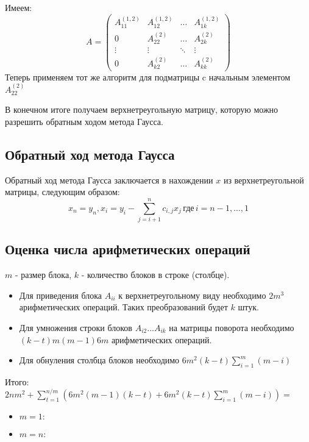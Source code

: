 \documentclass[a4paper, fontsize=14pt]{article}
\begin{document}
		Имеем:
		\begin{equation*}
			A = \left(
			\begin{array}{cccc}
				A_{11}^{(1,2)} & A_{12}^{(1,2)} & \ldots & A_{1k}^{(1,2)}\\
				0 & A_{22}^{(2)} & \ldots & A_{2k}^{(2)}\\
				\vdots & \vdots & \ddots & \vdots\\
				0 & A_{k2}^{(2)} & \ldots & A_{kk}^{(2)}
			\end{array}
			\right)
		\end{equation*}
		Теперь применяем тот же алгоритм для подматрицы c начальным элементом $A_{22}^{(2)}$
		
		В конечном итоге получаем верхнетреугольную матрицу, которую можно разрешить обратным ходом метода Гаусса.
	 	\subsection{Обратный ход метода Гаусса}
	    Обратный ход метода Гаусса заключается в нахождении $x$ из верхнетреугольной матрицы, следующим образом:
	 	$$x_n = y_n, x_i = y_i - \sum_{j = i+1}^{n} c_{i,j}x_j \,\text{где} \, i=n-1,\dots,1$$
	 	
		\subsection{Оценка числа арифметических операций}
		$m$ - размер блока, $k$ - количество блоков в строке (столбце). 
		\begin{itemize}
			\item Для приведения блока $A_{ii}$ к верхнетреугольному виду необходимо $2m^3$ арифметических операций. Таких преобразований будет $k$ штук.
			\item Для умножения строки блоков $A_{i2}\dots A_{ik}$ на матрицы поворота необходимо $(k-t)m(m-1)6m$ арифметических операций.
			\item Для обнуления столбца блоков необходимо $6m^2(k-t)\sum_{i = 1}^{m} (m - i)$ 
		\end{itemize}
		Итого:
		$2nm^2 + \sum_{t = 1}^{n/m} (6m^2(m-1)(k-t) + 6m^2(k-t)\sum_{i = 1}^{m} (m - i)) = $
	
		\begin{itemize}
			\item $m = 1:$
			\item $m = n:$
		\end{itemize}
\end{document}
